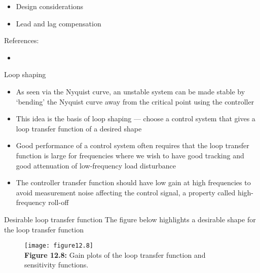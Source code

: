 \documentclass{beamer-control}
\begin{document}

\begin{SUMMARY}
\begin{itemize}
\item Design considerations
\item Lead and lag compensation
\end{itemize}
\vfill References:
\begin{itemize}
\item {}
\end{itemize}
\end{SUMMARY}




\begin{frame}{Loop shaping}
\begin{itemize}
\item As seen via the Nyquist curve, an unstable system can be made stable by `bending' the Nyquist curve away from the critical point using the controller
\item This idea is the basis of loop shaping --- choose a control system that gives a loop transfer function of a desired shape
\item Good performance of a control system often requires that the loop transfer function is large for frequencies where we wish to have good tracking and good attenuation of low-frequency load disturbance
\item The controller transfer function should have low gain at high frequencies to avoid measurement noise affecting the control signal, a property called high-frequency roll-off
\end{itemize}

\end{frame}


\begin{frame}{Desirable loop transfer function }
The figure below highlights a desirable shape for the loop transfer function
\begin{figure}
	\centering
	\texttt{[image: figure12.8]}\\
	\textbf{Figure 12.8:} Gain plots of the loop transfer function and sensitivity functions.
\end{figure}
\end{frame}
\end{document}
